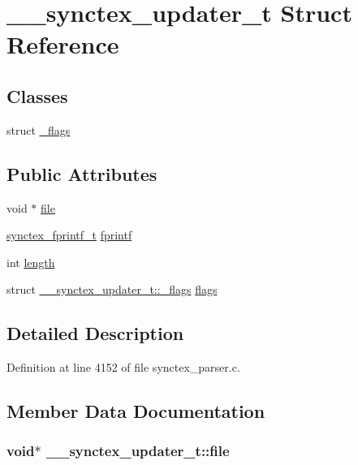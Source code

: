 \hypertarget{struct____synctex__updater__t}{\section{\+\_\+\+\_\+synctex\+\_\+updater\+\_\+t Struct Reference}
\label{struct____synctex__updater__t}
}
\subsection*{Classes}
\begin{DoxyCompactItemize}
\item 
struct \hyperlink{struct____synctex__updater__t_1_1__flags}{\+\_\+flags}
\end{DoxyCompactItemize}
\subsection*{Public Attributes}
\begin{DoxyCompactItemize}
\item 
void $\ast$ \hyperlink{struct____synctex__updater__t_ad46e3a20399c072bab2b5e5bd6984bc8}{file}
\item 
\hyperlink{synctex__parser_8c_a4ffd45e24fabfd771cf495754e4d173a}{synctex\+\_\+fprintf\+\_\+t} \hyperlink{struct____synctex__updater__t_a46b15c92f83b585176dc0b39bce363c3}{fprintf}
\item 
int \hyperlink{struct____synctex__updater__t_ae675c2ae1794c2f15d7a492253bb38e5}{length}
\item 
struct \hyperlink{struct____synctex__updater__t_1_1__flags}{\+\_\+\+\_\+synctex\+\_\+updater\+\_\+t\+::\+\_\+flags} \hyperlink{struct____synctex__updater__t_a1de70c5930356a900a1d2abe4255b8d4}{flags}
\end{DoxyCompactItemize}


\subsection{Detailed Description}


Definition at line 4152 of file synctex\+\_\+parser.\+c.



\subsection{Member Data Documentation}
\hypertarget{struct____synctex__updater__t_ad46e3a20399c072bab2b5e5bd6984bc8}{
\subsubsection[{file}]{\setlength{\rightskip}{0pt plus 5cm}void$\ast$ \+\_\+\+\_\+synctex\+\_\+updater\+\_\+t\+::file}}\label{struct____synctex__updater__t_ad46e3a20399c072bab2b5e5bd6984bc8}


